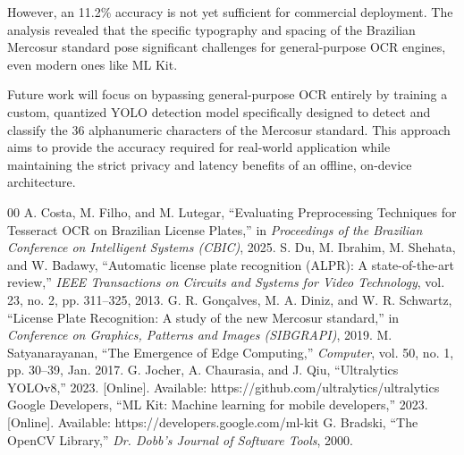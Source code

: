 \documentclass[conference]{IEEEtran}
\begin{document}
However, an 11.2\% accuracy is not yet sufficient for commercial deployment. The analysis revealed that the specific typography and spacing of the Brazilian Mercosur standard pose significant challenges for general-purpose OCR engines, even modern ones like ML Kit. 

Future work will focus on bypassing general-purpose OCR entirely by training a custom, quantized YOLO detection model specifically designed to detect and classify the 36 alphanumeric characters of the Mercosur standard. This approach aims to provide the accuracy required for real-world application while maintaining the strict privacy and latency benefits of an offline, on-device architecture.

\begin{thebibliography}{00}
 A. Costa, M. Filho, and M. Lutegar, ``Evaluating Preprocessing Techniques for Tesseract OCR on Brazilian License Plates,'' in \emph{Proceedings of the Brazilian Conference on Intelligent Systems (CBIC)}, 2025.
 S. Du, M. Ibrahim, M. Shehata, and W. Badawy, ``Automatic license plate recognition (ALPR): A state-of-the-art review,'' \emph{IEEE Transactions on Circuits and Systems for Video Technology}, vol. 23, no. 2, pp. 311--325, 2013.
 G. R. Gonçalves, M. A. Diniz, and W. R. Schwartz, ``License Plate Recognition: A study of the new Mercosur standard,'' in \emph{Conference on Graphics, Patterns and Images (SIBGRAPI)}, 2019.
 M. Satyanarayanan, ``The Emergence of Edge Computing,'' \emph{Computer}, vol. 50, no. 1, pp. 30--39, Jan. 2017.
 G. Jocher, A. Chaurasia, and J. Qiu, ``Ultralytics YOLOv8,'' 2023. [Online]. Available: https://github.com/ultralytics/ultralytics
 Google Developers, ``ML Kit: Machine learning for mobile developers,'' 2023. [Online]. Available: https://developers.google.com/ml-kit
 G. Bradski, ``The OpenCV Library,'' \emph{Dr. Dobb's Journal of Software Tools}, 2000.
\end{thebibliography}
\end{document}
